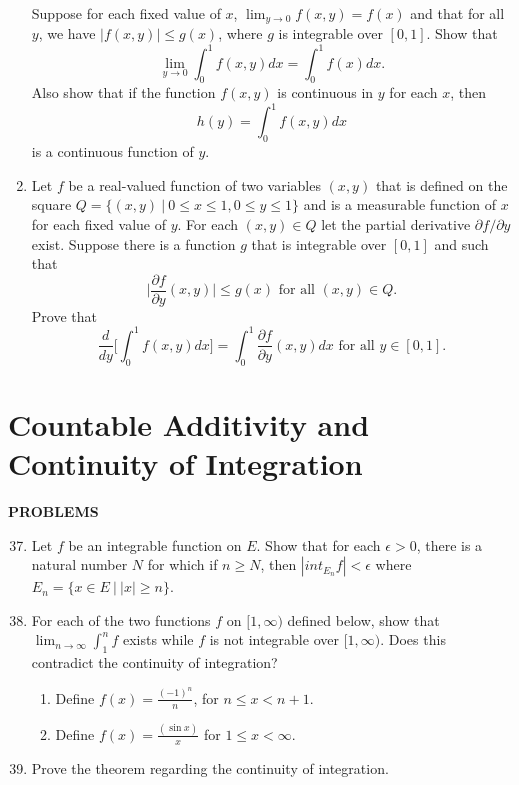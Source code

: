\begin{enumerate}
    Suppose for each fixed value of $x$, $\lim_{y\to0}f(x,y)=f(x)$ and that for all $y$, we have $|f(x,y)|\le g(x)$, where $g$ is integrable over $[0,1]$. Show that
    \[
    \lim_{y\to0}\int_0^1f(x,y)dx=\int_0^1f(x)dx.    
    \] 
    Also show that if the function $f(x,y)$ is continuous in $y$ for each $x$, then 
    \[
        h(y)=\int_0^1f(x,y)dx 
    \]
    is a continuous function of $y$.
    \item Let $f$ be a real-valued function of two variables $(x,y)$ that is defined on the square $Q=\{(x,y)\ |\ 0\le x\le 1,0\le y\le 1\}$ and is a measurable function of $x$ for each fixed value of $y$.
    For each $(x,y)\in Q$ let the partial derivative $\partial f/\partial y$ exist. Suppose there is a function $g$ that is integrable over $[0,1]$ and such that 
    \[
        \biggl | \frac{\partial f}{\partial y}(x,y) \biggr | \le g(x)\text{ for all }(x,y)\in Q.
    \]
    Prove that 
    \[
        \frac{d}{dy}\biggl[\int_0^1f(x,y)dx\biggr]=\int_0^1\frac{\partial f}{\partial y}(x,y)dx\text{ for all }y\in [0,1].
    \]
\end{enumerate}

\section{Countable Additivity and Continuity of Integration}
\begin{center}
	\textbf{PROBLEMS}
\end{center}
\begin{enumerate}
	\setcounter{enumi}{36}
    \item Let $f$ be an integrable function on $E$. Show that for each $\epsilon>0$, there is a natural number $N$ for which if $n\ge N$, then $|int_{E_n}f|<\epsilon$ where $E_n=\{x\in E\ |\ |x|\ge n\}$.
    \item For each of the two functions $f$ on $[1,\infty)$ defined below, show that $\lim_{n\to\infty}\int_1^nf$ exists while $f$ is not integrable over $[1,\infty)$. Does this contradict the continuity of integration?
    \begin{enumerate}[label=(\roman*),align=left]
        \item Define $f(x)=\frac{(-1)^n}{n}$, for $n\le x < n+1$.
        \item Define $f(x) = \frac{(\sin x)}{x}$ for $1\le x<\infty$.
    \end{enumerate}
    \item Prove the theorem regarding the continuity of integration.
\end{enumerate}

